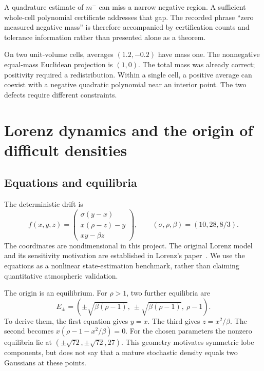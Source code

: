 A quadrature estimate of $m^-$ can miss a narrow negative region. A sufficient whole-cell polynomial certificate addresses that gap. The recorded phrase ``zero measured negative mass'' is therefore accompanied by certification counts and tolerance information rather than presented alone as a theorem.

\begin{example}
On two unit-volume cells, averages $(1.2,-0.2)$ have mass one. The nonnegative equal-mass Euclidean projection is $(1,0)$. The total mass was already correct; positivity required a redistribution. Within a single cell, a positive average can coexist with a negative quadratic polynomial near an interior point. The two defects require different constraints.
\end{example}

\chapter{Lorenz dynamics and the origin of difficult densities}\label{ch:lorenz}
\section{Equations and equilibria}
The deterministic drift is
\begin{equation}\label{eq:lorenz}
f(x,y,z)=\begin{pmatrix}\sigma(y-x)\\x(\rho-z)-y\\xy-\beta z\end{pmatrix},
\qquad (\sigma,\rho,\beta)=(10,28,8/3).
\end{equation}
The coordinates are nondimensional in this project. The original Lorenz model and its sensitivity motivation are established in Lorenz's paper~\cite{lorenz}. We use the equations as a nonlinear state-estimation benchmark, rather than claiming quantitative atmospheric validation.

The origin is an equilibrium. For $\rho>1$, two further equilibria are
\begin{equation}
E_\pm=(\pm\sqrt{\beta(\rho-1)},\ \pm\sqrt{\beta(\rho-1)},\ \rho-1).
\end{equation}
To derive them, the first equation gives $y=x$. The third gives $z=x^2/\beta$. The second becomes $x(\rho-1-x^2/\beta)=0$. For the chosen parameters the nonzero equilibria lie at $(\pm\sqrt{72},\pm\sqrt{72},27)$. This geometry motivates symmetric lobe components, but does not say that a mature stochastic density equals two Gaussians at these points.

